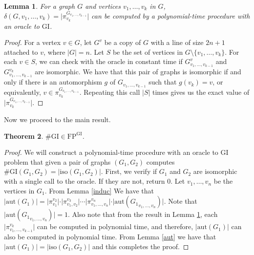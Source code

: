 \documentclass{article}
\def\shgi{\mbox{\#GI}}
\def\lgi{\mbox{GI}}
\def\fp{\mbox{FP}}
\def\aut{\mbox{aut}}
\def\iso{\mbox{iso}}
\newtheorem{theo}{Theorem}
\newtheorem{lemma}[theo]{Lemma}
\begin{document}
\begin{lemma}\label{polypi}
	For a graph $G$ and vertices $v_1,\ldots,v_k$ in $G$, $\delta(G,v_1,\ldots,v_k) = \vert \pi^{G_{v_1,\ldots,v_{k-1}}}_{v_k} \vert$ can be computed by a polynomial-time procedure with an oracle to $\lgi$.
\end{lemma}
\begin{proof}
	For a vertex $v\in G$, let $G^{v}$ be a copy of $G$ with a line of size $2n+1$ attached to $v$, where $\vert G \vert = n$. Let $S$ be the set of vertices in $G\setminus\{v_1,\ldots,v_k\}$. For each $v\in S$, we can check with the oracle in constant time if $G^{v}_{v_1,\ldots,v_{k-1}}$ and $G^{v_k}_{v_1,\ldots,v_{k-1}}$ are isomorphic. We have that this pair of graphs is isomorphic if and only if there is an automorphism $g$ of $G_{v_1,\ldots,v_{k-1}}$ such that $g(v_k) = v$, or equivalently, $v\in \pi^{G_{v_1,\ldots,v_{k-1}}}_{v_k}$. Repeating this call $\vert S \vert$ times gives us the exact value of $\vert \pi^{G_{v_1,\ldots,v_{k-1}}}_{v_k} \vert$.
\end{proof}

Now we proceed to the main result.

\begin{theo}
	$\shgi\in\fp^{\lgi}$.
\end{theo}
\begin{proof}
	We will construct a polynomial-time procedure with an oracle to $\lgi$ problem that given a pair of graphs $(G_1,G_2)$ computes $\shgi(G_1,G_2) = \vert \iso(G_1,G_2) \vert$. First, we verify if $G_1$ and $G_2$ are isomorphic with a single call to the oracle. If they are not, return 0. Let $v_1,\ldots,v_n$ be the vertices in $G_1$. From Lemma \ref{induc} We have that $\vert\aut(G_1)\vert = \vert \pi^{v_2}_{v_1} \vert \cdot \vert \pi^{v_3}_{v_1,v_2} \vert \cdots \vert \pi^{v_n}_{v_1,\ldots,v_n} \vert\cdot\vert\aut({G_1}_{v_1,\ldots,v_n}) \vert$. Note that $\vert\aut({G_1}_{v_1,\ldots,v_n}) \vert = 1$. Also note that from the result in Lemma \ref{polypi}, each $\vert\pi^{v_k}_{v_1,\ldots,v_{k-1}}\vert$ can be computed in polynomial time, and therefore, $\vert \aut(G_1) \vert$ can also be computed in polynomial time. From Lemma \ref{aut} we have that $\vert \aut(G_1) \vert = \vert \iso(G_1,G_2) \vert$ and this completes the proof.
\end{proof}
 


\end{document}
